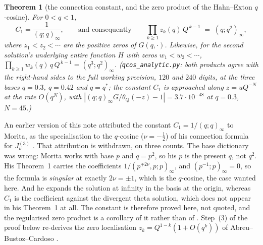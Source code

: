 \documentclass[11pt]{article}
\theoremstyle{plain}
\newtheorem{theorem}{Theorem}
\theoremstyle{definition}
\theoremstyle{remark}
\begin{document}
\begin{theorem}[the connection constant, and the zero product of the Hahn--Exton $q$-cosine]
\label{thm:zeroproduct}
For $0<q<1$,
\[
   C_1=\frac1{(q;q)_\infty},
   \qquad\text{and consequently}\qquad
   \prod_{k\ge1} z_k(q)\,Q^{\,k-1}\;=\;(q;q^2)_\infty ,
\]
where $z_1<z_2<\cdots$ are the positive zeros of $G(q,\cdot)$. Likewise, for the second solution's
underlying entire function $H$ with zeros $w_1<w_2<\cdots$,
$\prod_{k\ge1}w_k(q)\,q\,Q^{\,k-1}=(q^3;q^2)_\infty$. \textup{(\texttt{qcos\_analytic.py}:
both products agree with the right-hand sides to the full working precision, $120$ and $240$
digits, at the three bases $q=0.3$, $q=0.42$ and $q=q^\ast$; the constant $C_1$ is approached
along $z=uQ^{-N}$ at the rate $O(q^N)$, with $|(q;q)_\infty G/\theta_Q(-z)-1|=3.7\cdot10^{-48}$
at $q=0.3$, $N=45$.)}
\end{theorem}

\noindent An earlier version of this note attributed the constant $C_1=1/(q;q)_\infty$ to
Morita, as the specialisation to the $q$-cosine ($\nu=-\tfrac12$) of his connection formula for
$J^{(3)}_\nu$ \cite[Thm.~1]{Morita2011}. That attribution is withdrawn, on three counts. The base
dictionary was wrong: Morita works with base $p$ and $q=p^2$, so his $p$ is the present $q$, not
$q^2$. His Theorem~1 carries the coefficients $1/(p^{\mp2\nu},p;p)_\infty$, and
$(p^{-1};p)_\infty=0$, so the formula is \emph{singular} at exactly $2\nu=\pm1$, which is the
$q$-cosine, the case wanted here. And he expands the solution at infinity in the basis at the
origin, whereas $C_1$ is the coefficient against the divergent theta solution, which does not
appear in his Theorem~1 at all. The constant is therefore proved here, not quoted, and the
regularised zero product is a corollary of it rather than of \cite{Morita2011}. Step~(3) of the proof below re-derives the zero localisation
$z_k=Q^{1-k}(1+O(q^k))$ of Abreu--Bustoz--Cardoso \cite[Thm.~2.3]{ABC2003}.
\end{document}
